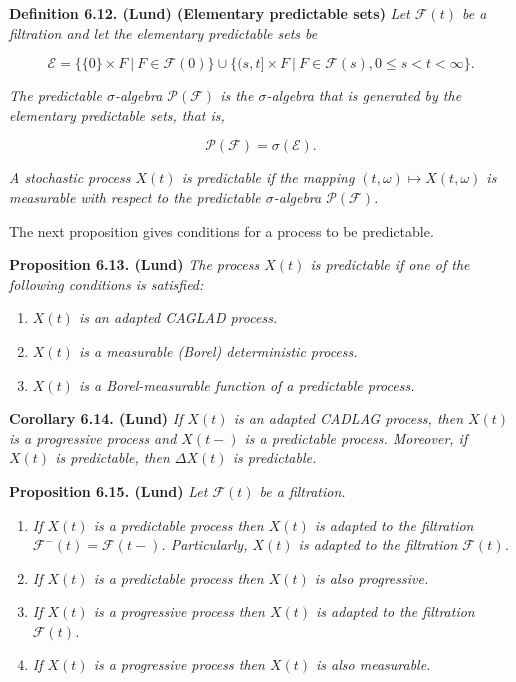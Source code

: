 \documentclass[a4paper,10pt,openany]{book}
\providecommand{\tightlist}{%
 \setlength{\itemsep}{0pt}\setlength{\parskip}{0pt}}
\begin{document}
\textbf{Definition 6.12. (Lund) (Elementary predictable sets)} \emph{Let \(\mathcal F(t)\) be a filtration and let the elementary predictable sets be}

\[
\mathcal E=\Big\{\{0\}\times F\ \vert\ F\in\mathcal F(0)\Big\}\cup\Big\{(s,t]\times F\ \vert\ F\in\mathcal F(s), 0\le s<t<\infty\Big\}.
\]

\emph{The predictable \(\sigma\)-algebra \(\mathcal P(\mathcal F)\) is the \(\sigma\)-algebra that is generated by the elementary predictable sets, that is,}

\[
\mathcal P(\mathcal F) = \sigma(\mathcal E).
\]

\emph{A stochastic process \(X(t)\) is predictable if the mapping \((t,\omega) \mapsto X(t,\omega)\) is measurable with respect to the predictable \(\sigma\)-algebra \(\mathcal P(\mathcal F)\).}

The next proposition gives conditions for a process to be predictable.

\textbf{Proposition 6.13. (Lund)} \emph{The process \(X(t)\) is predictable if one of the following conditions is satisfied:}

\begin{enumerate}
\def\labelenumi{(\roman{enumi})}
\tightlist
\item
  \emph{\(X(t)\) is an adapted CAGLAD process.}
\item
  \emph{\(X(t)\) is a measurable (Borel) deterministic process.}
\item
  \emph{\(X(t)\) is a Borel-measurable function of a predictable process.}
\end{enumerate}

\textbf{Corollary 6.14. (Lund)} \emph{If \(X(t)\) is an adapted CADLAG process, then \(X(t)\) is a progressive process and \(X(t−)\) is a predictable process. Moreover, if \(X(t)\) is predictable, then \(\Delta X(t)\) is predictable.}

\textbf{Proposition 6.15. (Lund)} \emph{Let \(\mathcal F(t)\) be a filtration.}

\begin{enumerate}
\def\labelenumi{(\roman{enumi})}
\tightlist
\item
  \emph{If \(X(t)\) is a predictable process then \(X(t)\) is adapted to the filtration \(\mathcal F^−(t) =\mathcal F(t−)\). Particularly, \(X(t)\) is adapted to the filtration \(\mathcal F(t)\).}
\item
  \emph{If \(X(t)\) is a predictable process then \(X(t)\) is also progressive.}
\item
  \emph{If \(X(t)\) is a progressive process then \(X(t)\) is adapted to the filtration \(\mathcal F(t)\).}
\item
  \emph{If \(X(t)\) is a progressive process then \(X(t)\) is also measurable.}
\end{enumerate}
\end{document}
